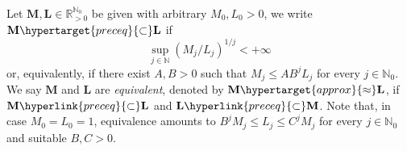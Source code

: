 \documentclass[11pt,a4paper]{article}
\makeatletter
\theoremstyle{plain}
\theoremstyle{definition}
\DeclareRobustCommand\widecheck[1]{{\mathpalette\@widecheck{#1}}}
\def\@widecheck#1#2{%
	\setbox\z@\hbox{\m@th$#1#2$}%
	\setbox\tw@\hbox{\m@th$#1%
		\widehat{%
			\vrule\@width\z@\@height\ht\z@
			\vrule\@height\z@\@width\wd\z@}$}%
	\dp\tw@-\ht\z@
	\@tempdima\ht\z@ \advance\@tempdima2\ht\tw@ \divide\@tempdima\thr@@
	\setbox\tw@\hbox{%
		 \raise\@tempdima\hbox{\scalebox{1}[-1]{\lower\@tempdima\box
				\tw@}}}%
	{\ooalign{\box\tw@ \cr \box\z@}}}
\renewcommand{\check}[1]{\widecheck{#1}}
\renewcommand{\widecheck}[1]{\widecheck{#1}}
\newcommand{\RR}{\mathbb{R}}
\newcommand{\NN}{\mathbb{N}}
\newcommand{\M}{\mathbf{M}}
\newcommand{\LL}{\mathbf{L}}
\let\on=\operatorname
\DeclareRobustCommand\widecheck[1]{{\mathpalette\@widecheck{#1}}}
\def\@widecheck#1#2{%
    \setbox\z@\hbox{\m@th$#1#2$}%
    \setbox\tw@\hbox{\m@th$#1%
       \widehat{%
          \vrule\@width\z@\@height\ht\z@
          \vrule\@height\z@\@width\wd\z@}$}%
    \dp\tw@-\ht\z@
    \@tempdima\ht\z@ \advance\@tempdima2\ht\tw@ \divide\@tempdima\thr@@
    \setbox\tw@\hbox{%
       \raise\@tempdima\hbox{\scalebox{1}[-1]{\lower\@tempdima\box
\tw@}}}%
    {\ooalign{\box\tw@ \cr \box\z@}}}
\makeatother
\begin{document}
%

%


Let $\M,\LL\in\RR_{>0}^{\NN_0}$ be given {with arbitrary $M_0,L_0>0$}, we write $\M\hypertarget{preceq}{\subset}\LL$ if 
$$\sup_{j\in\NN}\left(M_j/L_j\right)^{1/j}<+\infty
$$ 
or, equivalently, if there exist $A,B>0$ such that $M_j\le AB^jL_j$ for every $j\in\NN_0$. We say $\M$ and $\LL$ are {\itshape equivalent}, denoted by $\M\hypertarget{approx}{\approx}\LL$, if $\M\hyperlink{preceq}{\subset}\LL$ and $\LL\hyperlink{preceq}{\subset}\M$.
Note that, in case $M_0=L_0=1$, equivalence amounts to $B^jM_j\le L_j\le C^jM_j$ for every $j\in\NN_0$ and suitable $B,C>0$.

\end{document}
